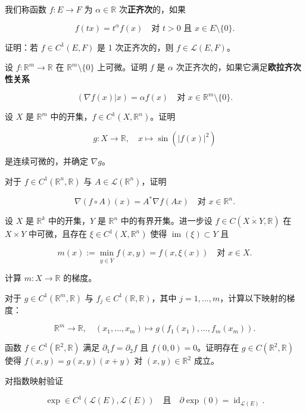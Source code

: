 \begin{exercises}
\item

我们称函数 $ f : E \to F $ 为 $ \alpha \in \mathbb{R} $ 次\textbf{正齐次}的，如果

\[
f(tx) = t^{\alpha} f(x) \quad \text{对 } t > 0 \text{ 且 } x \in E \setminus \{0\} .
\]

证明：若 $ f \in C^{1}(E, F) $ 是 1 次正齐次的，则 $ f \in \mathcal{L}(E, F) $。

\item

设 $ f : \mathbb{R}^{m} \to \mathbb{R} $ 在 $ \mathbb{R}^{m} \setminus \{0\} $ 上可微。证明 $ f $ 是 $ \alpha $ 次正齐次的，如果它满足\textbf{欧拉齐次性关系}

\[
(\nabla f(x)|x) = \alpha f(x) \quad \text{对 } x \in \mathbb{R}^{m} \setminus \{0\} .
\]
\item

设 $ X $ 是 $ \mathbb{R}^{m} $ 中的开集，$ f \in C^{1}(X, \mathbb{R}^{n}) $。证明

\[
g : X \to \mathbb{R} , \quad x \mapsto \sin(|f(x)|^{2})
\]

是连续可微的，并确定 $ \nabla g $。

\item

对于 $ f \in C^{1}(\mathbb{R}^{n}, \mathbb{R}) $ 与 $ A \in \mathcal{L}(\mathbb{R}^{n}) $，证明

\[
\nabla(f \circ A)(x) = A^{*} \nabla f(Ax) \quad \text{对 } x \in \mathbb{R}^{n} .
\]
\item

设 $ X $ 是 $ \mathbb{R}^{k} $ 中的开集，$ Y $ 是 $ \mathbb{R}^{n} $ 中的有界开集。进一步设 $ f \in C(\overline{X \times Y}, \mathbb{R}) $ 在 $ X \times Y $ 中可微，且存在 $ \xi \in C^{1}(X, \mathbb{R}^{n}) $ 使得 $ \operatorname{im}(\xi) \subset Y $ 且

\[
m(x) := \min_{y \in \overline{Y}} f(x, y) = f(x, \xi(x)) \quad \text{对 } x \in X .
\]

计算 $ m : X \to \mathbb{R} $ 的梯度。

\item

对于 $ g \in C^{1}(\mathbb{R}^{m}, \mathbb{R}) $ 与 $ f_{j} \in C^{1}(\mathbb{R}, \mathbb{R}) $，其中 $ j = 1, \ldots, m $，计算以下映射的梯度：

\[
\mathbb{R}^{m} \to \mathbb{R} , \quad (x_{1}, \ldots, x_{m}) \mapsto g(f_{1}(x_{1}), \ldots, f_{m}(x_{m})) .
\]
\item

函数 $ f \in C^{1}(\mathbb{R}^{2}, \mathbb{R}) $ 满足 $ \partial_{1} f = \partial_{2} f $ 且 $ f(0, 0) = 0 $。证明存在 $ g \in C(\mathbb{R}^{2}, \mathbb{R}) $ 使得 $ f(x, y) = g(x, y)(x + y) $ 对 $ (x, y) \in \mathbb{R}^{2} $ 成立。

\item

对指数映射验证

\[
\exp \in C^{1}(\mathcal{L}(E), \mathcal{L}(E)) \quad \text{且} \quad \partial \exp(0) = \operatorname{id}_{\mathcal{L}(E)} .
\]
\end{exercises}

